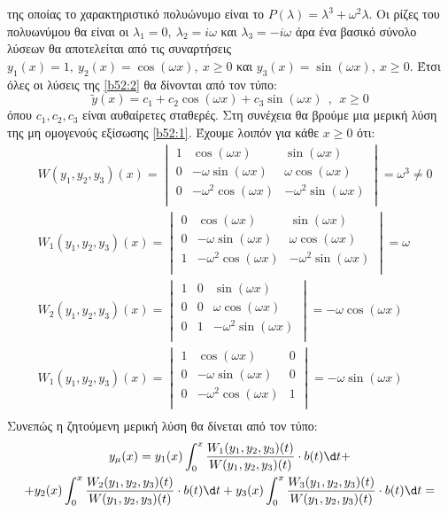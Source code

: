 \documentclass[a4paper,twoside,11pt]{book}
\DeclareRobustCommand{\frac}[3][0pt]{%
{\begingroup\hspace{#1}#2\hspace{#1}\endgroup\over\hspace{#1}#3\hspace{#1}}}
\begin{document}
της οποίας το χαρακτηριστικό πολυώνυμο είναι το $ P(\lambda)=\lambda^3+\omega^2\lambda $. Οι ρίζες του πολυωνύμου θα είναι οι $ \lambda_1=0,\ \lambda_2=i\omega $ και $ \lambda_3=-i\omega $ άρα ένα βασικό σύνολο λύσεων θα αποτελείται από τις συναρτήσεις $ y_1(x)=1,\ y_2(x)=\cos{(\omega x)},\ x\geq 0 $ και $ y_3(x)=\sin{(\omega x)},\ x\geq 0 $. Έτσι όλες οι λύσεις της \eqref{b52:2} θα δίνονται από τον τύπο:
\[ \tilde{y}(x)=c_1+c_2\cos{(\omega x)}+c_3\sin{(\omega x)}\ \ ,\ \ x\geq0 \]
όπου $ c_1,c_2,c_3 $ είναι αυθαίρετες σταθερές. Στη συνέχεια θα βρούμε μια μερική λύση της μη ομογενούς εξίσωσης \eqref{b52:1}. Έχουμε λοιπόν για κάθε $ x\geq0 $ ότι:
\begin{align}
&W(y_1,y_2,y_3)(x)=\begin{vmatrix}
1 & \cos{(\omega x)} & \sin{(\omega x)}\\
0 & -\omega\sin{(\omega x)} & \omega\cos{(\omega x)}\\
0 & -\omega^2\cos{(\omega x)} & -\omega^2\sin{(\omega x)}\\
\end{vmatrix}=\omega^3\neq 0\\ 
&W_1(y_1,y_2,y_3)(x)=\begin{vmatrix}
0 & \cos{(\omega x)} & \sin{(\omega x)}\\
0 & -\omega\sin{(\omega x)} & \omega\cos{(\omega x)}\\
1 & -\omega^2\cos{(\omega x)} & -\omega^2\sin{(\omega x)}\\
\end{vmatrix}=\omega\\
&W_2(y_1,y_2,y_3)(x)=\begin{vmatrix}
1 & 0 & \sin{(\omega x)}\\
0 & 0 & \omega\cos{(\omega x)}\\
0 & 1 & -\omega^2\sin{(\omega x)}\\
\end{vmatrix}=-\omega\cos{(\omega x)}\\ 
&W_1(y_1,y_2,y_3)(x)=\begin{vmatrix}
1 & \cos{(\omega x)} & 0\\
0 & -\omega\sin{(\omega x)} & 0 \\
0 & -\omega^2\cos{(\omega x)} & 1\\
\end{vmatrix}=-\omega\sin{(\omega x)}\\
\end{align}
Συνεπώς η ζητούμενη μερική λύση θα δίνεται από τον τύπο:
\begin{multline*}
y_\mu(x)=y_1(x)\int_{0}^{x}{\frac{W_1(y_1,y_2,y_3)(t)}{W(y_1,y_2,y_3)(t)}\cdot b(t)\d t}+\\+y_2(x)\int_{0}^{x}{\frac{W_2(y_1,y_2,y_3)(t)}{W(y_1,y_2,y_3)(t)}\cdot b(t)\d t}+y_3(x)\int_{0}^{x}{\frac{W_3(y_1,y_2,y_3)(t)}{W(y_1,y_2,y_3)(t)}\cdot b(t)\d t}=
\end{multline*}
\end{document}
